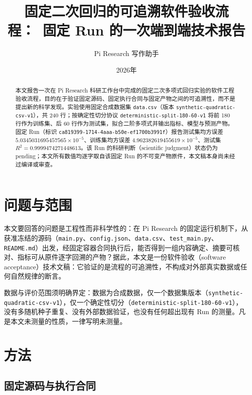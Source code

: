 \documentclass[a4paper,11pt]{article}
\begin{document}
\title{固定二次回归的可追溯软件验收流程：\ 固定 Run 的一次端到端技术报告}
\author{Pi Research 写作助手}
\date{2026年}
\maketitle

\begin{abstract}
本文报告一次在 Pi Research 科研工作台中完成的固定二次多项式回归实验的软件工程验收流程，目的在于验证固定源码、固定执行合同与固定产物之间的可追溯性，而不是提出新的科学发现。实验使用固定合成数据集 \texttt{data.csv}（版本 \texttt{synthetic-quadratic-csv-v1}），共 240 行；按确定性切分协议 \texttt{deterministic-split-180-60-v1} 将前 180 行作为训练集、后 60 行作为测试集，拟合二阶多项式并输出指标、模型与预测产物。固定 Run（标识 \texttt{ca819399-1714-4aaa-b50e-ef1700b3991f}）报告测试集均方误差 $5.0345031695457565\times10^{-5}$、训练集均方误差 $4.962382619455619\times10^{-5}$、测试集 $R^2=0.9999474271448613$。该 Run 的科研判断（scientific judgment）状态仍为 pending；本文所有数值均逐字取自该固定 Run 的不可变产物原件，本文稿本身尚未经过编译或审查。
\end{abstract}

\section{问题与范围}

本文要回答的问题是工程性而非科学性的：在 Pi Research 的固定运行机制下，从获准冻结的源码（\texttt{main.py}、\texttt{config.json}、\texttt{data.csv}、\texttt{test\_main.py}、\texttt{README.md}）出发，经固定容器合同执行后，能否得到一组内容确定、摘要可核对、指标可从原件逐字回溯的产物？据此，本文是一份软件验收（software acceptance）技术文稿：它验证的是流程的可追溯性，不构成对外部真实数据或任何自然规律的断言。

数据与评价范围须明确界定：数据为合成数据，仅一个数据集版本（\texttt{synthetic-quadratic-csv-v1}），仅一个确定性切分（\texttt{deterministic-split-180-60-v1}），没有多随机种子重复、没有外部数据验证，也没有任何超出现有 Run 的测量。凡是本文未测量的性质，一律写明未测量。

\section{方法}

\subsection{固定源码与执行合同}
\end{document}
